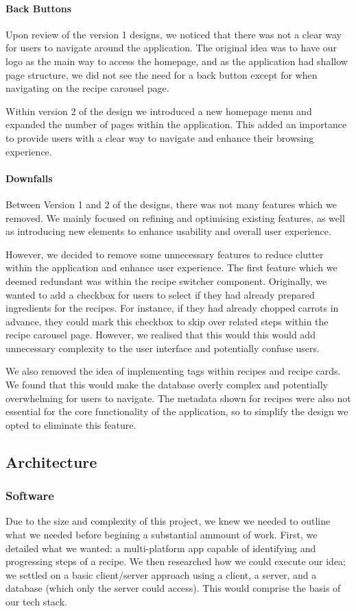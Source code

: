 \documentclass{article}
\begin{document}
\paragraph{Back Buttons}
Upon review of the version 1 designs, we noticed that there was not a clear way for users to navigate around the application. The original idea was to have our logo as the main way to access the homepage, and as the application had shallow page structure, we did not see the need for a back button except for when navigating on the recipe carousel page.

Within version 2 of the design we introduced a new homepage menu and expanded the number of pages within the application. This added an importance to provide users with a clear way to navigate and enhance their browsing experience. 

\paragraph{Downfalls}
Between Version 1 and 2 of the designs, there was not many features which we removed. We mainly focused on refining and optimising existing features, as well as introducing new elements to enhance usability and overall user experience.

However, we decided to remove some unnecessary features to reduce clutter within the application and enhance user experience. The first feature which we deemed redundant was within the recipe switcher component. Originally, we wanted to add a checkbox for users to select if they had already prepared ingredients for the recipes. For instance, if they had already chopped carrots in advance, they could mark this checkbox to skip over related steps within the recipe carousel page. However, we realised that this would this would add unnecessary complexity to the user interface and potentially confuse users.

We also removed the idea of implementing tags within recipes and recipe cards. We found that this would make the database overly complex and potentially overwhelming for users to navigate. The metadata shown for recipes were also not essential for the core functionality of the application, so to simplify the design we opted to eliminate this feature.


    \subsection{Architecture}
    \subsubsection{Software}
    Due to the size and complexity of this project, we knew we needed to outline what we needed before begining a substantial ammount of work. First, we detailed what we wanted: a multi-platform app capable of identifying and progressing steps of a recipe. We then researched how we could execute our idea; we settled on a basic client/server approach using a client, a server, and a database (which only the server could access). This would comprise the basis of our tech stack.
\end{document}
